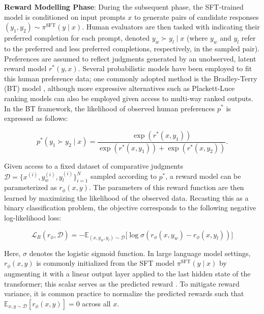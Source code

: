 \textbf{Reward Modelling Phase}: During the subsequent phase, the SFT-trained model is conditioned on input prompts $x$ to generate pairs of candidate responses $(y_1, y_2)\sim \pi^\text{SFT}(y \mid x)$. Human evaluators are then tasked with indicating their preferred completion for each prompt, denoted $y_w\succ y_l \mid x$ (where $y_w$ and $y_l$ refer to the preferred and less preferred completions, respectively, in the sampled pair). Preferences are assumed to reflect judgments generated by an unobserved, latent reward model $r^*(y, x)$. Several probabilistic models have been employed to fit this human preference data; one commonly adopted method is the Bradley-Terry (BT) model \cite{bradley1952rankanalysis}, although more expressive alternatives such as Plackett-Luce ranking models \citep{plackett1975analysis, luce2012individual} can also be employed given access to multi-way ranked outputs. In the BT framework, the likelihood of observed human preferences $p^*$ is expressed as follows:

\begin{equation}\label{eq:bradley-terry}
    p^*(y_1\succ y_2 \mid x)=\frac{\exp\left(r^*(x, y_1)\right)}{\exp\left(r^*(x, y_1)\right) + \exp\left(r^*(x, y_2)\right)}.
\end{equation}

Given access to a fixed dataset of comparative judgments $\mathcal{D}=\bigl\{x^{(i)}, y_w^{(i)}, y_l^{(i)}\bigr\}_{i=1}^N$ sampled according to $p^*$, a reward model can be parameterized as $r_{\phi}(x, y)$. The parameters of this reward function are then learned by maximizing the likelihood of the observed data. Recasting this as a binary classification problem, the objective corresponds to the following negative log-likelihood loss:

\begin{equation}\label{eq:reward_model}
    \mathcal{L}_R(r_{\phi}, \mathcal{D}) = -\mathbb{E}_{(x, y_w, y_l)\sim \mathcal{D}}\bigl[\log \sigma(r_{\phi}(x, y_w)- r_{\phi}(x, y_l))\bigr]
\end{equation}

Here, $\sigma$ denotes the logistic sigmoid function. In large language model settings, $r_{\phi}(x, y)$ is commonly initialized from the SFT model $\pi^\text{SFT}(y \mid x)$ by augmenting it with a linear output layer applied to the last hidden state of the transformer; this scalar serves as the predicted reward \cite{ziegler2020finetuning}. To mitigate reward variance, it is common practice to normalize the predicted rewards such that $\mathbb{E}_{x,y\sim \mathcal{D}}\left[r_\phi(x, y)\right] = 0$ across all $x$.

